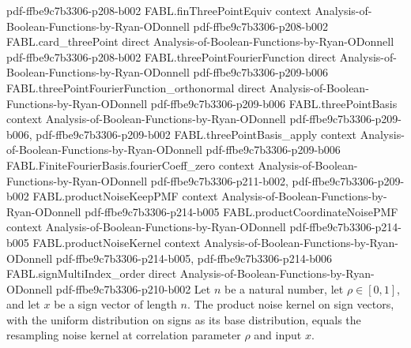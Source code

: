 \begin{theorem}
  {pdf-ffbe9c7b3306-p208-b002}
\proofstep
  {FABL.finThreePointEquiv}
  {context}
  {Analysis-of-Boolean-Functions-by-Ryan-ODonnell}
  {pdf-ffbe9c7b3306-p208-b002}
\proofstep
  {FABL.card_threePoint}
  {direct}
  {Analysis-of-Boolean-Functions-by-Ryan-ODonnell}
  {pdf-ffbe9c7b3306-p208-b002}
\proofstep
  {FABL.threePointFourierFunction}
  {direct}
  {Analysis-of-Boolean-Functions-by-Ryan-ODonnell}
  {pdf-ffbe9c7b3306-p209-b006}
\proofstep
  {FABL.threePointFourierFunction_orthonormal}
  {direct}
  {Analysis-of-Boolean-Functions-by-Ryan-ODonnell}
  {pdf-ffbe9c7b3306-p209-b006}
\proofstep
  {FABL.threePointBasis}
  {context}
  {Analysis-of-Boolean-Functions-by-Ryan-ODonnell}
  {pdf-ffbe9c7b3306-p209-b006,
    pdf-ffbe9c7b3306-p209-b002}
\proofstep
  {FABL.threePointBasis_apply}
  {context}
  {Analysis-of-Boolean-Functions-by-Ryan-ODonnell}
  {pdf-ffbe9c7b3306-p209-b006}
\proofstep
  {FABL.FiniteFourierBasis.fourierCoeff_zero}
  {context}
  {Analysis-of-Boolean-Functions-by-Ryan-ODonnell}
  {pdf-ffbe9c7b3306-p211-b002,
    pdf-ffbe9c7b3306-p209-b002}
\proofstep
  {FABL.productNoiseKeepPMF}
  {context}
  {Analysis-of-Boolean-Functions-by-Ryan-ODonnell}
  {pdf-ffbe9c7b3306-p214-b005}
\proofstep
  {FABL.productCoordinateNoisePMF}
  {context}
  {Analysis-of-Boolean-Functions-by-Ryan-ODonnell}
  {pdf-ffbe9c7b3306-p214-b005}
\proofstep
  {FABL.productNoiseKernel}
  {context}
  {Analysis-of-Boolean-Functions-by-Ryan-ODonnell}
  {pdf-ffbe9c7b3306-p214-b005,
    pdf-ffbe9c7b3306-p214-b006}
\proofstep
  {FABL.signMultiIndex_order}
  {direct}
  {Analysis-of-Boolean-Functions-by-Ryan-ODonnell}
  {pdf-ffbe9c7b3306-p210-b002}
Let $n$ be a natural number, let $\rho\in[0,1]$, and let $x$ be a sign vector of length
$n$. The product noise kernel on sign vectors, with the uniform distribution on signs as
its base distribution, equals the resampling noise kernel at correlation parameter
$\rho$ and input $x$.
\end{theorem}

